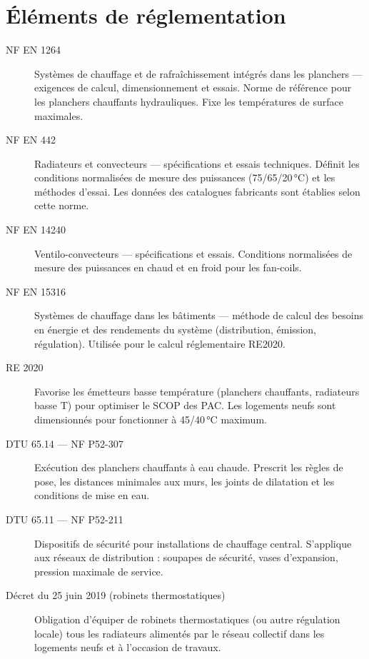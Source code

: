 \section{Éléments de réglementation}

\begin{description}
  \item[NF EN 1264] Systèmes de chauffage et de rafraîchissement intégrés dans les planchers — exigences de calcul, dimensionnement et essais. Norme de référence pour les planchers chauffants hydrauliques. Fixe les températures de surface maximales.

  \item[NF EN 442] Radiateurs et convecteurs — spécifications et essais techniques. Définit les conditions normalisées de mesure des puissances (75/65/20\,°C) et les méthodes d'essai. Les données des catalogues fabricants sont établies selon cette norme.

  \item[NF EN 14240] Ventilo-convecteurs — spécifications et essais. Conditions normalisées de mesure des puissances en chaud et en froid pour les fan-coils.

  \item[NF EN 15316] Systèmes de chauffage dans les bâtiments — méthode de calcul des besoins en énergie et des rendements du système (distribution, émission, régulation). Utilisée pour le calcul réglementaire RE2020.

  \item[RE 2020] Favorise les émetteurs basse température (planchers chauffants, radiateurs basse T) pour optimiser le SCOP des PAC. Les logements neufs sont dimensionnés pour fonctionner à 45/40\,°C maximum.

  \item[DTU 65.14 — NF P52-307] Exécution des planchers chauffants à eau chaude. Prescrit les règles de pose, les distances minimales aux murs, les joints de dilatation et les conditions de mise en eau.

  \item[DTU 65.11 — NF P52-211] Dispositifs de sécurité pour installations de chauffage central. S'applique aux réseaux de distribution : soupapes de sécurité, vases d'expansion, pression maximale de service.

  \item[Décret du 25 juin 2019 (robinets thermostatiques)] Obligation d'équiper de robinets thermostatiques (ou autre régulation locale) tous les radiateurs alimentés par le réseau collectif dans les logements neufs et à l'occasion de travaux.
\end{description}


